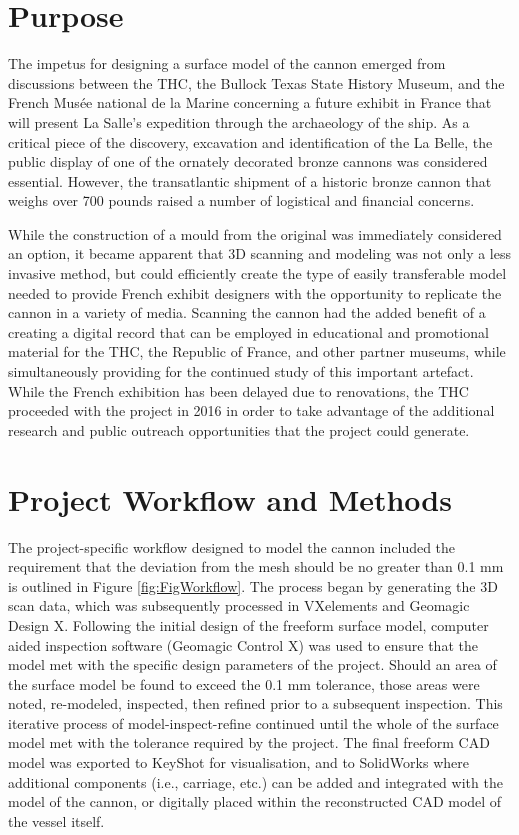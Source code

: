 \documentclass[review]{elsarticle}
\begin{document}
\section*{Purpose}

The impetus for designing a surface model of the cannon emerged from discussions between the THC, the Bullock Texas State History Museum, and the French Musée national de la Marine concerning a future exhibit in France that will present La Salle's expedition through the archaeology of the ship. As a critical piece of the discovery, excavation and identification of the La Belle, the public display of one of the ornately decorated bronze cannons was considered essential. However, the transatlantic shipment of a historic bronze cannon that weighs over 700 pounds raised a number of logistical and financial concerns.

While the construction of a mould from the original was immediately considered an option, it became apparent that 3D scanning and modeling was not only a less invasive method, but could efficiently create the type of easily transferable model needed to provide French exhibit designers with the opportunity to replicate the cannon in a variety of media. Scanning the cannon had the added benefit of a creating a digital record that can be employed in educational and promotional material for the THC, the Republic of France, and other partner museums, while simultaneously providing for the continued study of this important artefact. While the French exhibition has been delayed due to renovations, the THC proceeded with the project in 2016 in order to take advantage of the additional research and public outreach opportunities that the project could generate.

\section*{Project Workflow and Methods}

The project-specific workflow designed to model the cannon included the requirement that the deviation from the mesh should be no greater than 0.1 mm is outlined in Figure \ref{fig:FigWorkflow}. The process began by generating the 3D scan data, which was subsequently processed in VXelements and Geomagic Design X. Following the initial design of the freeform surface model, computer aided inspection software (Geomagic Control X) was used to ensure that the model met with the specific design parameters of the project. Should an area of the surface model be found to exceed the 0.1 mm tolerance, those areas were noted, re-modeled, inspected, then refined prior to a subsequent inspection. This iterative process of model-inspect-refine continued until the whole of the surface model met with the tolerance required by the project. The final freeform CAD model was exported to KeyShot for visualisation, and to SolidWorks where additional components (i.e., carriage, etc.) can be added and integrated with the model of the cannon, or digitally placed within the reconstructed CAD model of the vessel itself.
\end{document}
